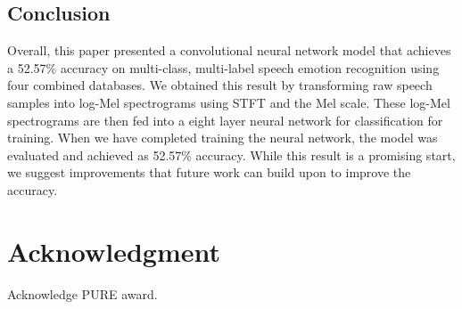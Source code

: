 \documentclass[conference]{IEEEtran}
\begin{document}
\subsection{Conclusion}

Overall, this paper presented a convolutional neural network model that achieves a 52.57\% accuracy on multi-class, multi-label speech emotion recognition using four combined databases. We obtained this result by transforming raw speech samples into log-Mel spectrograms using STFT and the Mel scale. These log-Mel spectrograms are then fed into a eight layer neural network for classification for training. When we have completed training the neural network, the model was evaluated and achieved as 52.57\% accuracy. While this result is a promising start, we suggest improvements that future work can build upon to improve the accuracy.

\section*{Acknowledgment}
Acknowledge PURE award.




\end{document}
